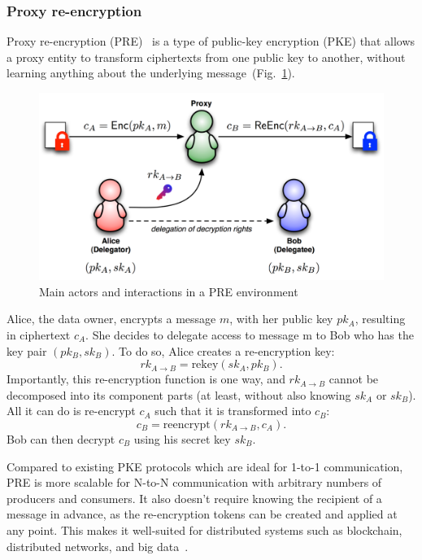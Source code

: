 \documentclass[notitlepage,longbibliography]{revtex4-1}
\begin{document}
\subsubsection{Proxy re-encryption}
Proxy re-encryption (PRE)~\cite{wiki:pre,phd:nunez} is a type of public-key encryption (PKE) that allows a proxy entity to transform ciphertexts
from one public key to another, without learning anything about the underlying message~(Fig.~\ref{fig:pre}).

\begin{figure}
\centering
    \includegraphics[width=0.6\columnwidth]{pdf/pre.png}  %
    \caption{Main actors and interactions in a PRE environment}
    \label{fig:pre}
\end{figure}

Alice, the data owner, encrypts a message $m$, with her public key $pk_A$, resulting in ciphertext $c_A$.
She decides to delegate access to message m to Bob who has the key pair $(pk_B, sk_B)$.
To do so, Alice creates a re-encryption key:
\begin{equation}
    rk_{A\rightarrow B} = \text{rekey}(sk_A, pk_B).
\end{equation}
Importantly, this re-encryption function is one way, and $rk_{A\rightarrow B}$ cannot be decomposed into its component parts
(at least, without also knowing $sk_A$ or $sk_B$).
All it can do is re-encrypt $c_A$ such that it is transformed into $c_B$:
\begin{equation}
    c_B = \text{reencrypt}(rk_{A\rightarrow B}, c_{A}).
\end{equation}
Bob can then decrypt $c_{B}$ using his secret key $sk_{B}$.

Compared to existing PKE protocols which are ideal for 1-to-1 communication, PRE is more scalable for N-to-N communication
with arbitrary numbers of producers and consumers.
It also doesn't require knowing the recipient of a message in advance, as the re-encryption tokens can be created and applied at any point.
This makes it well-suited for distributed systems such as blockchain, distributed networks, and big data~\cite{web:nucypher-hadoop}.
\end{document}
